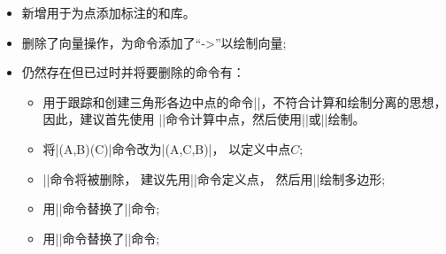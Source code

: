 \documentclass[../main.tex]{subfiles}
\begin{document}
\begin{itemize}
\item 新增用于为点添加标注的和库。

\item 删除了向量操作，为命令添加了\enquote{->}以绘制向量;

\item 仍然存在但已过时并将要删除的命令有：
\begin{itemize}

\item 用于跟踪和创建三角形各边中点的命令|\tkzDrawMedians|，不符合计算和绘制分离的思想，
因此，建议首先使用 |\tkzSpcTriangle[median]|命令计算中点，然后使用|\tkzDrawSegments|或|\tkzDrawLines|绘制。

\item 将|\tkzDrawMedians(A,B)(C)|命令改为|\tkzDrawMedians(A,C,B)|，
以定义中点$C$;

\item |\tkzDrawTriangle[equilateral]|命令将被删除，
建议先用|\tkzDefTriangle[equilateral]|命令定义点，
然后用|\tkzDrawPolygon|绘制多边形;

\item 用|\tkzGetRandPointOn|命令替换了|\tkzDefRandPointOn|命令;
\item 用|\tkzDefTangent|命令替换了|\tkzTangent|命令;


\end{itemize}
\end{itemize}
\end{document}
